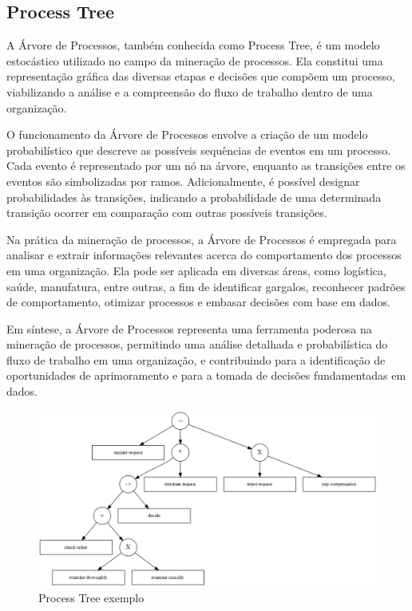 \documentclass[tcc2]{classe_uftex/uftex}
\begin{document}
\subsection{Process Tree}

A Árvore de Processos, também conhecida como Process Tree, é um modelo estocástico utilizado no campo da mineração de processos. Ela constitui uma representação gráfica das diversas etapas e decisões que compõem um processo, viabilizando a análise e a compreensão do fluxo de trabalho dentro de uma organização.\cite{erdfelder2009multinomial}

O funcionamento da Árvore de Processos envolve a criação de um modelo probabilístico que descreve as possíveis sequências de eventos em um processo. Cada evento é representado por um nó na árvore, enquanto as transições entre os eventos são simbolizadas por ramos. Adicionalmente, é possível designar probabilidades às transições, indicando a probabilidade de uma determinada transição ocorrer em comparação com outras possíveis transições.

Na prática da mineração de processos, a Árvore de Processos é empregada para analisar e extrair informações relevantes acerca do comportamento dos processos em uma organização. Ela pode ser aplicada em diversas áreas, como logística, saúde, manufatura, entre outras, a fim de identificar gargalos, reconhecer padrões de comportamento, otimizar processos e embasar decisões com base em dados.\cite{erdfelder2009multinomial}

Em síntese, a Árvore de Processos representa uma ferramenta poderosa na mineração de processos, permitindo uma análise detalhada e probabilística do fluxo de trabalho em uma organização, e contribuindo para a identificação de oportunidades de aprimoramento e para a tomada de decisões fundamentadas em dados.

\begin{figure}[h]
    \centering
    \includegraphics[width=12cm]{tcc_example/process_tree_running_example.png}
    \caption{Process Tree exemplo }
\end{figure}
\end{document}
